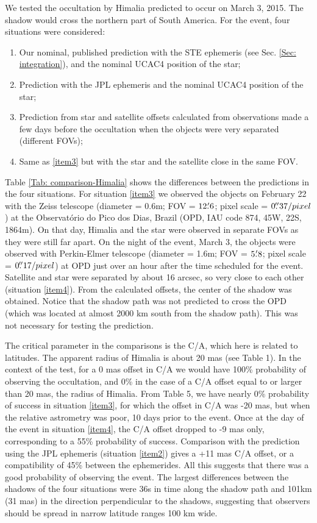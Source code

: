 \documentclass[useAMS,usenatbib]{mn2e}
\begin{document}
We tested the occultation by Himalia predicted to occur on March 3, 2015. The shadow would cross the northern part of South America. For the event, four situations were considered:
\begin{enumerate}[I]
\item\label{item1} Our nominal, published prediction with the STE ephemeris (see Sec. \ref{Sec: integration}), and the nominal UCAC4 position of the star;
\item\label{item2} Prediction with the JPL ephemeris and the nominal UCAC4 position of the star;
\item\label{item3} Prediction from star and satellite offsets calculated from observations made a few days before the occultation when the objects were very separated (different FOVs);
\item\label{item4} Same as \ref{item3} but with the star and the satellite close in the same FOV.
\end{enumerate}

Table \ref{Tab: comparison-Himalia} shows the differences between the predictions in the four situations. For situation \ref{item3} we observed the objects on February 22 with the Zeiss telescope (diameter = 0.6m; FOV = $12\hbox{$.\mkern-4mu^\prime$}6$; pixel scale = $0\hbox{$.\!\!^{\prime\prime}$}37 / pixel$) at the Observatório do Pico dos Dias, Brazil (OPD, IAU code 874, 45\arcsec W, 22\arcsec S, 1864m). On that day, Himalia and the star were observed in separate FOVs as they were still far apart. On the night of the event, March 3, the objects were observed with Perkin-Elmer telescope (diameter = 1.6m; FOV = $5\hbox{$.\mkern-4mu^\prime$}8$; pixel scale = $0\hbox{$.\!\!^{\prime\prime}$}17 / pixel$) at OPD just over an hour after the time scheduled for the event. Satellite and star were separated by about 16 arcsec, so very close to each other (situation \ref{item4}). From the calculated offsets, the center of the shadow was obtained. Notice that the shadow path was not predicted to cross the OPD (which was located at almost 2000 km south from the shadow path). This was not necessary for testing the prediction.

The critical parameter in the comparisons is the C/A, which here is related to latitudes. The apparent radius of Himalia is about 20 mas (see Table 1). In the context of the test, for a 0 mas offset in C/A we would have 100\% probability of observing the occultation, and 0\% in the case of a C/A offset equal to or larger than 20 mas, the radius of Himalia. From Table 5, we have nearly 0\% probability of success in situation \ref{item3}, for which the offset in C/A was -20 mas, but when the relative astrometry was poor, 10 days prior to the event. Once at the day of the event in situation \ref{item4}, the C/A offset dropped to -9 mas only, corresponding to a 55\% probability of success. Comparison with the prediction using the JPL ephemeris (situation \ref{item2}) gives a +11 mas C/A offset, or a compatibility of 45\% between the ephemerides. All this suggests that there was a good probability of observing the event. The largest differences between the shadows of the four situations were 36s in time along the shadow path and 101km (31 mas) in the direction perpendicular to the shadows, suggesting that observers should be spread in narrow latitude ranges 100 km wide.
\end{document}
